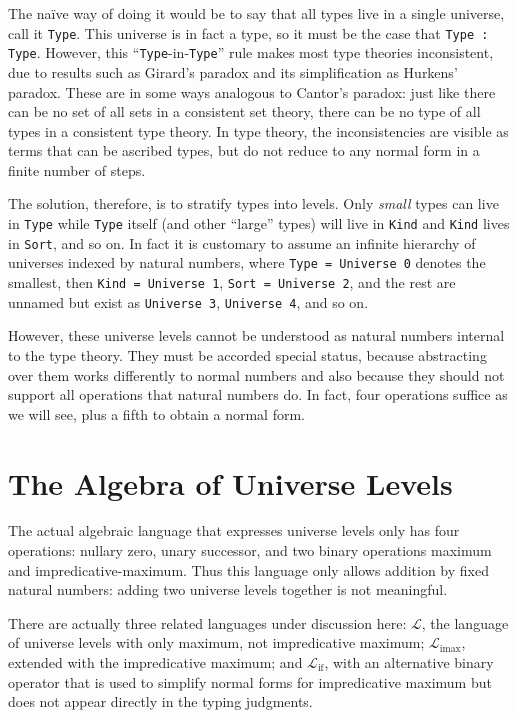 \documentclass[11pt, twoside, reqno]{book}
\DeclareMathOperator{\imax}{imax}
\DeclareMathOperator{\ifop}{if}
\begin{document}
The na\" ive way of doing it would be to say that all types live in a single universe, call it \verb`Type`.
This universe is in fact a type, so it must be the case that \verb`Type : Type`.
However, this ``\verb`Type`-in-\verb`Type`'' rule makes most type theories inconsistent, due to results such as Girard's paradox and its simplification as Hurkens' paradox.
These are in some ways analogous to Cantor's paradox: just like there can be no set of all sets in a consistent set theory, there can be no type of all types in a consistent type theory.
In type theory, the inconsistencies are visible as terms that can be ascribed types, but do not reduce to any normal form in a finite number of steps.

The solution, therefore, is to stratify types into levels.
Only \emph{small} types can live in \verb`Type` while \verb`Type` itself (and other ``large'' types) will live in \verb`Kind` and \verb`Kind` lives in \verb`Sort`, and so on.
In fact it is customary to assume an infinite hierarchy of universes indexed by natural numbers, where \verb`Type = Universe 0` denotes the smallest, then \verb`Kind = Universe 1`, \verb`Sort = Universe 2`, and the rest are unnamed but exist as \verb`Universe 3`, \verb`Universe 4`, and so on.

However, these universe levels cannot be understood as natural numbers internal to the type theory.
They must be accorded special status, because abstracting over them works differently to normal numbers and also because they should not support all operations that natural numbers do.
In fact, four operations suffice as we will see, plus a fifth to obtain a normal form.

\section{The Algebra of Universe Levels}
\label{alg-uni-lvl}

The actual algebraic language that expresses universe levels only has four operations: nullary zero, unary successor, and two binary operations maximum and impredicative-maximum.
Thus this language only allows addition by fixed natural numbers: adding two universe levels together is not meaningful.

There are actually three related languages under discussion here: $\mathcal{L}$, the language of universe levels with only maximum, not impredicative maximum; $\mathcal{L}_{\imax}$, extended with the impredicative maximum; and $\mathcal{L}_{\ifop}$, with an alternative binary operator that is used to simplify normal forms for impredicative maximum but does not appear directly in the typing judgments.
\end{document}
